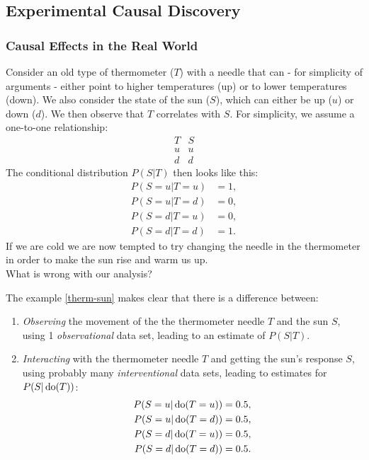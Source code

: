 \subsection{Experimental Causal Discovery}

\subsubsection{Causal Effects in the Real World}

\begin{Eg}
    \label{therm-sun}
    Consider an old type of thermometer ($T$) with a needle that can - for simplicity of arguments - either point to higher temperatures (up) or to lower temperatures (down).
    We also consider the state of the sun ($S$), which can either be up ($u$) or down ($d$).
    We then observe that $T$ correlates with $S$. For simplicity, we assume a one-to-one relationship:
    \[\begin{array}{c|c} 
        T & S \\ 
        \hline
        u & u \\
        d & d
    \end{array}\]
    The conditional distribution $P(S|T)$ then looks like this:
    \begin{align*}
        P(S=u|T=u) & = 1, \\
        P(S=u|T=d) & = 0, \\
        P(S=d|T=u) & = 0, \\
        P(S=d|T=d) & = 1.
    \end{align*}
    If we are cold we are now tempted to try changing the needle in the thermometer in order to make the sun rise and warm us up.\\
What is wrong with our analysis?
\end{Eg}

\begin{Disc}
    The example \ref{therm-sun} makes clear that there is a difference between:
    \begin{enumerate}
        \item \emph{Observing} the movement of the the thermometer needle $T$ and the sun $S$, using 1 \emph{observational} data set, 
            leading to an estimate of $P(S|T)$.
        \item \emph{Interacting} with the thermometer needle $T$ and getting the sun's response $S$, using probably many \emph{interventional} data sets, leading to estimates for $P(S|\operatorname{do}(T))$:
                \begin{align*}
                    P(S=u|\operatorname{do}(T=u)) & = 0.5, \\
                    P(S=u|\operatorname{do}(T=d)) & = 0.5, \\
                    P(S=d|\operatorname{do}(T=u)) & = 0.5, \\
                    P(S=d|\operatorname{do}(T=d)) & = 0.5.
    \end{align*}
    \end{enumerate}
\end{Disc}

